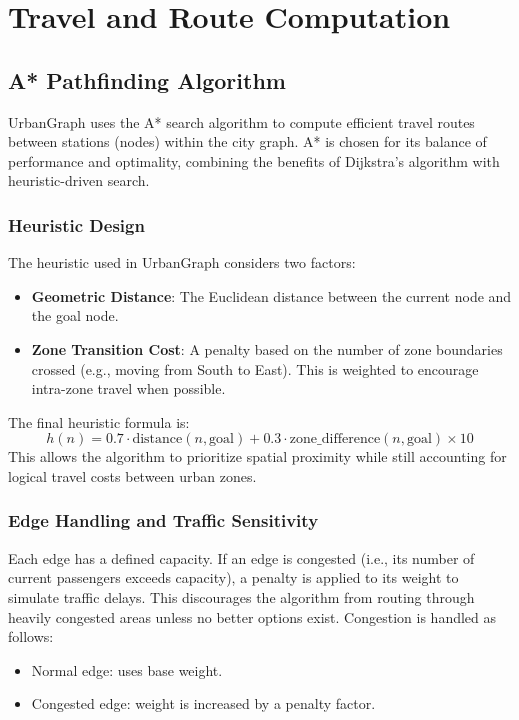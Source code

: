 \documentclass[12pt]{article}
\begin{document}
\newpage

\section{Travel and Route Computation}
\subsection{A* Pathfinding Algorithm}

UrbanGraph uses the A* search algorithm to compute efficient travel routes between stations (nodes) within the city graph. A* is chosen for its balance of performance and optimality, combining the benefits of Dijkstra's algorithm with heuristic-driven search.

\subsubsection*{Heuristic Design}

The heuristic used in UrbanGraph considers two factors:
\begin{itemize}
    \item \textbf{Geometric Distance}: The Euclidean distance between the current node and the goal node.
    \item \textbf{Zone Transition Cost}: A penalty based on the number of zone boundaries crossed (e.g., moving from South to East). This is weighted to encourage intra-zone travel when possible.
\end{itemize}

The final heuristic formula is:
\[
h(n) = 0.7 \cdot \text{distance}(n, \text{goal}) + 0.3 \cdot \text{zone\_difference}(n, \text{goal}) \times 10
\]
This allows the algorithm to prioritize spatial proximity while still accounting for logical travel costs between urban zones.

\subsubsection*{Edge Handling and Traffic Sensitivity}

Each edge has a defined capacity. If an edge is congested (i.e., its number of current passengers exceeds capacity), a penalty is applied to its weight to simulate traffic delays. This discourages the algorithm from routing through heavily congested areas unless no better options exist. Congestion is handled as follows:
\begin{itemize}
    \item Normal edge: uses base weight.
    \item Congested edge: weight is increased by a penalty factor.
\end{itemize}
\end{document}
